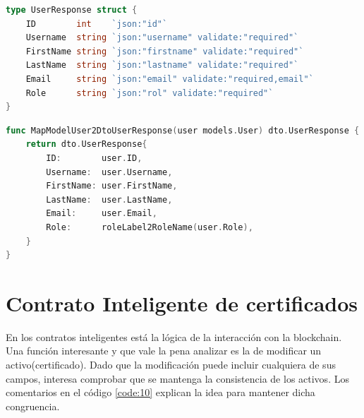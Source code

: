 \begin{lstlisting}[language=Go,caption={DTO UserResponse, encargado de presentar los detalles sobre usuarios de la base de datos}, label={code:8}]
type UserResponse struct {
	ID        int    `json:"id"`
	Username  string `json:"username" validate:"required"`
	FirstName string `json:"firstname" validate:"required"`
	LastName  string `json:"lastname" validate:"required"`
	Email     string `json:"email" validate:"required,email"`
	Role      string `json:"rol" validate:"required"`
}
\end{lstlisting}

\begin{lstlisting}[language=Go,caption={Mapper de modelo de usuario a dto de usuarios para mostrar al cliente}, label={code:9}]
func MapModelUser2DtoUserResponse(user models.User) dto.UserResponse {
	return dto.UserResponse{
		ID:        user.ID,
		Username:  user.Username,
		FirstName: user.FirstName,
		LastName:  user.LastName,
		Email:     user.Email,
		Role:      roleLabel2RoleName(user.Role),
	}
}
\end{lstlisting}

\section{Contrato Inteligente de certificados}
En los contratos inteligentes está la lógica de la interacción con la blockchain. Una función interesante y que vale la pena analizar es la de modificar un activo(certificado). Dado que la modificación puede incluir cualquiera de sus campos, interesa comprobar que se mantenga la consistencia de los activos. Los comentarios en el código \ref{code:10} explican la idea para mantener dicha congruencia.

